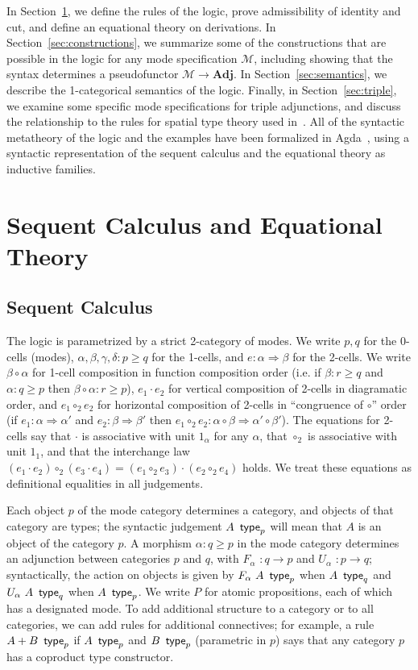 \documentclass{drl-common/llncs}
\newcommand{\M}{\ensuremath{\mathcal{M}}}
\newcommand{\tc}[2]{\ensuremath{#1 \Rightarrow #2}}
\newcommand{\Adj}{\textbf{Adj}}
\newcommand\compo[2]{\ensuremath{#1 \circ #2}}
\newcommand\compv[2]{\ensuremath{#1 \cdot #2}}
\newcommand\comph[2]{\ensuremath{#1 \mathbin{\circ_2} #2}}
\renewcommand\wftp[2]{\ensuremath{#1 \,\,\, \dsd{type}_{#2}}}
\newcommand\F[2]{\ensuremath{F_{#1} \,\, #2}}
\newcommand\U[2]{\ensuremath{U_{#1} \,\, #2}}
\newcommand\coprd[2]{\ensuremath{#1 + #2}}
\begin{document}
In Section~\ref{sec:rules}, we define the rules of the logic, prove
admissibility of identity and cut, and define an equational theory on
derivations.  In Section~\ref{sec:constructions}, we summarize some of
the constructions that are possible in the logic for any mode
specification \M, including showing that the syntax determines a
pseudofunctor $\M \to \Adj$.  In Section~\ref{sec:semantics}, we
describe the 1-categorical semantics of the logic.  Finally, in
Section~\ref{sec:triple}, we examine some specific mode specifications
for triple adjunctions, and discuss the relationship to the rules for
spatial type theory used in~\citep{shulman15realcohesion}.  All of the
syntactic metatheory of the logic and the examples have been formalized
in Agda~\citep{norell07thesis}, using a syntactic representation of the
sequent calculus and the equational theory as inductive families.  

\section{Sequent Calculus and Equational Theory}
\label{sec:rules}

\subsection{Sequent Calculus}

The logic is parametrized by a strict 2-category of modes.  We write
$p,q$ for the 0-cells (modes), $\alpha,\beta,\gamma,\delta : p \ge q$
for the 1-cells, and $e : \tc \alpha \beta$ for the 2-cells.  We write
\compo{\beta}{\alpha} for 1-cell composition in function composition
order (i.e. if $\beta : r \ge q$ and $\alpha : q \ge p$ then
$\compo{\beta}{\alpha} : r \ge p$), \compv{e_1}{e_2} for vertical
composition of 2-cells in diagramatic order, and \comph{e_1}{e_2} for
horizontal composition of 2-cells in ``congruence of \compo{}{}'' order
(if $e_1 : \tc \alpha {\alpha'}$ and $e_2 : \tc \beta \beta'$ then
$\comph{e_1}{e_2} :
\tc{\compo{\alpha}{\beta}}{\compo{\alpha'}{\beta'}}$).  The equations
for 2-cells say that \compv{}{} is associative with unit $1_\alpha$ for
any $\alpha$, that \comph{}{} is associative with unit $1_1$, and that
the interchange law $\comph{(\compv{e_1}{e_2})}{(\compv{e_3}{e_4})} =
\compv{(\comph{e_1}{e_3})}{(\comph{e_2}{e_4})}$ holds.  We treat these
equations as definitional equalities in all judgements.

Each object $p$ of the mode category determines a category, and objects
of that category are types; the syntactic judgement \wftp{A}{p} will
mean that $A$ is an object of the category $p$.  A morphism $\alpha : q
\ge p$ in the mode category determines an adjunction between categories
$p$ and $q$, with $\F \alpha {} : q \to p$ and $\U \alpha {} : p \to q$;
syntactically, the action on objects is given by $\wftp{\F \alpha A}{p}$
when $\wftp{A}{q}$ and $\wftp{\U \alpha A}{q}$ when $\wftp{A}{p}$.  We
write $P$ for atomic propositions, each of which has a designated mode.
To add additional structure to a category or to all categories, we can
add rules for additional connectives; for example, a rule
\wftp{\coprd{A}{B}}{p} if \wftp{A}{p} and \wftp{B}{p} (parametric in
$p$) says that any category $p$ has a coproduct type constructor.
\end{document}
